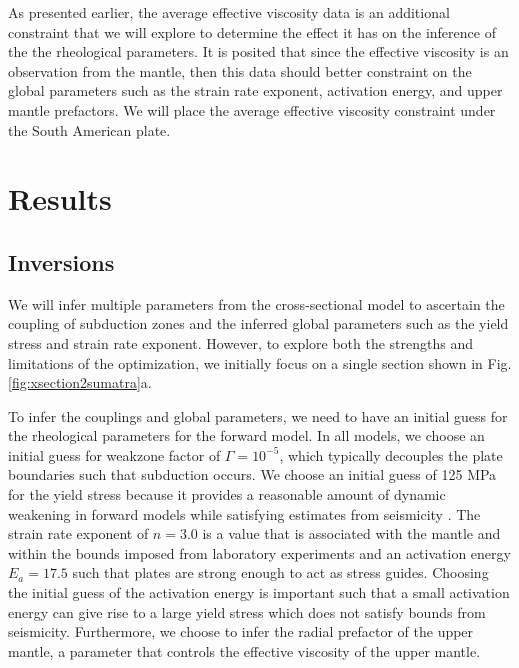 \documentclass[12pt]{article}
\begin{document}
As presented earlier, the average effective viscosity data is an additional constraint that we will explore to determine the effect it has on the inference of the the rheological parameters. It is posited that since the effective viscosity is an observation from the mantle, then this data should better constraint on the global parameters such as the strain rate exponent, activation energy, and upper mantle prefactors. We will place the average effective viscosity constraint under the South American plate. 

\section*{Results}
\subsection*{Inversions}
We will infer multiple parameters from the cross-sectional model to ascertain the coupling of subduction zones and the inferred global parameters such as the yield stress and strain rate exponent. However, to explore both the strengths and limitations of the optimization, we initially focus on a single section shown in Fig.\ref{fig:xsection2sumatra}a.  %

To infer the couplings and global parameters, we need to have an initial guess for the rheological parameters  for the forward model. In all models, we choose an initial guess for weakzone factor of $\Gamma=10^{-5}$, which typically decouples the plate boundaries such that subduction occurs. We choose an initial guess of 125 MPa for the yield stress because it provides a reasonable amount of dynamic weakening in forward models while satisfying estimates from seismicity \citep{craig2014reassessment}. The strain rate exponent of $n=3.0$ is a value that is associated with the mantle and within the bounds imposed from laboratory experiments and an activation energy $E_a=17.5$ such that plates are strong enough to act as stress guides. %
Choosing the initial guess of the activation energy is important such that a small activation energy can give rise to a large yield stress \citep{crameri2017dynamical} which does not satisfy bounds from seismicity. Furthermore, we choose to infer the radial prefactor of the upper mantle, a parameter that controls the effective viscosity of the upper mantle.  
\end{document}
